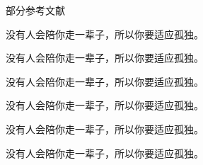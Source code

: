 \documentclass{otherloads/styles/ppt-xju-blue}
\begin{document}
	
	\begin{frame}[t]{部分参考文献}	
		\begin{thebibliography}{99}
			{\footnotesize
				 没有人会陪你走一辈子，所以你要适应孤独。
				
				 没有人会陪你走一辈子，所以你要适应孤独。
				
				 没有人会陪你走一辈子，所以你要适应孤独。
				
				 没有人会陪你走一辈子，所以你要适应孤独。

				 没有人会陪你走一辈子，所以你要适应孤独。
				
				 没有人会陪你走一辈子，所以你要适应孤独。
			}
		\end{thebibliography}	
		
	\end{frame}
	

	
\end{document}
